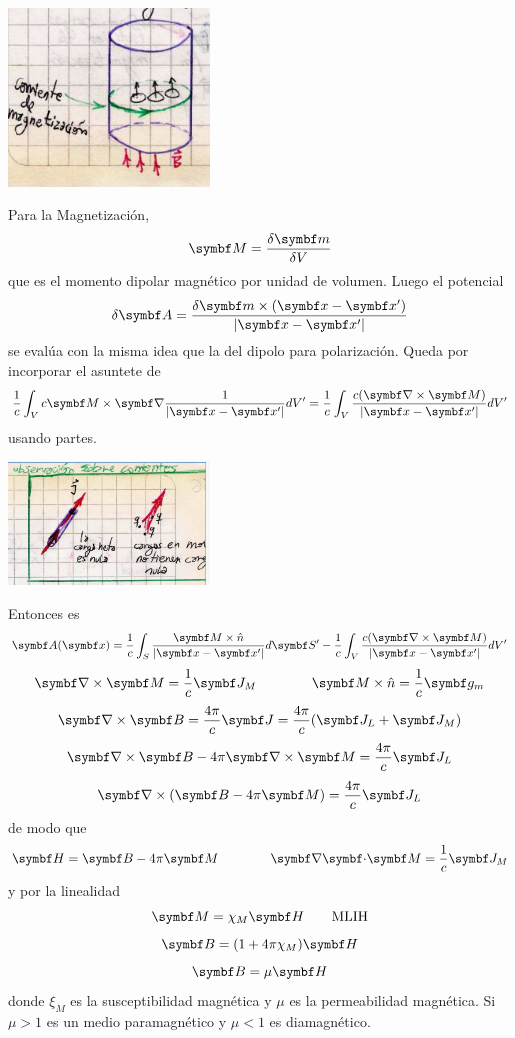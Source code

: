 \documentclass[10pt,oneside]{CBFT_book}
\begin{document}
\includegraphics[width=0.4\textwidth]{images/fig_ft1_imaninducidos.jpg}

Para la Magnetización,
\[
	\vb{M} = \frac{\delta \vb{m}}{\delta V}
\]
que es el momento dipolar magnético por unidad de volumen. Luego el potencial 
\[
	\delta\vb{A} = \frac{ \delta \vb{m} \times ( \vbx - \vbx') }{|\vbx - \vbx'|}
\]
se evalúa con la misma idea que la del dipolo para polarización.
Queda por incorporar el asuntete de 
\[
	\frac{1}{c} \int_V c \vb{M} \times \Nabla\frac{ 1 }{|\vb{x}-\vb{x}'|}  dV'
	= \frac{1}{c} \int_V \frac{ c(\rotorm{M}) }{|\vb{x}-\vb{x}'|}  dV'
\]
usando partes.

\includegraphics[width=0.4\textwidth]{images/fig_ft1_imaninducidos_nota.jpg}

Entonces es
\[
	\vb{A}( \vb{x}) = \frac{1}{c} \int_S 
	\frac{ \vb{M}\times\hat{n} }{|\vb{x}-\vb{x}'|} d\vb{S}' - 
	\frac{1}{c} \int_V \frac{ c(\rotorm{M}) }{|\vb{x}-\vb{x}'|}  dV'
\]
\[
	\rotorm{M} = \frac{1}{c}\vb{J}_M \qquad \qquad \vb{M}\times\hat{n} = \frac{1}{c}\vb{g}_m
\]
\[
	\rotorm{B} = \frac{4\pi}{c}\vb{J}  = \frac{4\pi}{c}( \vb{J}_L + \vb{J}_M )
\]
\[
	\rotorm{B} - 4\pi \rotorm{M} = \frac{4\pi}{c}\vb{J}_L
\]
\[
	\Nabla\times( \vb{B} - 4\pi\vb{M} ) = \frac{4\pi}{c}\vb{J}_L 
\]
de modo que
\[
	\vb{H} = \vb{B} - 4 \pi \vb{M} \qquad \qquad \divem{M} = \frac{1}{c}\vb{J}_M  
\]
y por la linealidad
\[
	\vb{M} = \chi_M \vb{H} \qquad \text{MLIH}
\]
\[
	\vb{B} = ( 1 + 4\pi\chi_M ) \vb{H} 
\]
\[
	\vb{B} = \mu \vb{H}
\]
donde $\xi_M$ es la susceptibilidad magnética y $\mu$ es la permeabilidad magnética.
Si $\mu > 1 $ es un medio paramagnético y $\mu < 1$ es diamagnético.
\end{document}
